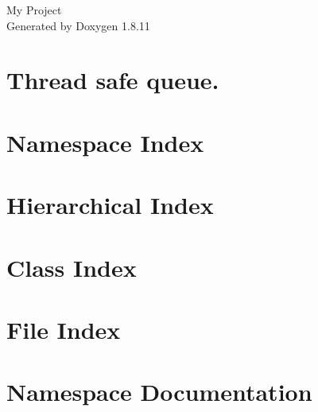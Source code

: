 \documentclass[twoside]{book}
\newcommand{\+}{\discretionary{\mbox{\scriptsize$\hookleftarrow$}}{}{}}
\newcommand{\clearemptydoublepage}{%
  \newpage{\pagestyle{empty}\cleardoublepage}%
}
\begin{document}
\hypersetup{pageanchor=false,
             bookmarksnumbered=true,
             pdfencoding=unicode
            }
\begin{titlepage}
\vspace*{7cm}
\begin{center}%
{\Large My Project }\\
\vspace*{1cm}
{\large Generated by Doxygen 1.8.11}\\
\end{center}
\end{titlepage}
\clearemptydoublepage
\tableofcontents
\clearemptydoublepage
{}
\hypersetup{pageanchor=true}

\chapter{Thread safe queue.}
\label{md_project_Readme}
\hypertarget{md_project_Readme}{}

\chapter{Namespace Index}

\chapter{Hierarchical Index}

\chapter{Class Index}

\chapter{File Index}

\chapter{Namespace Documentation}

\end{document}
